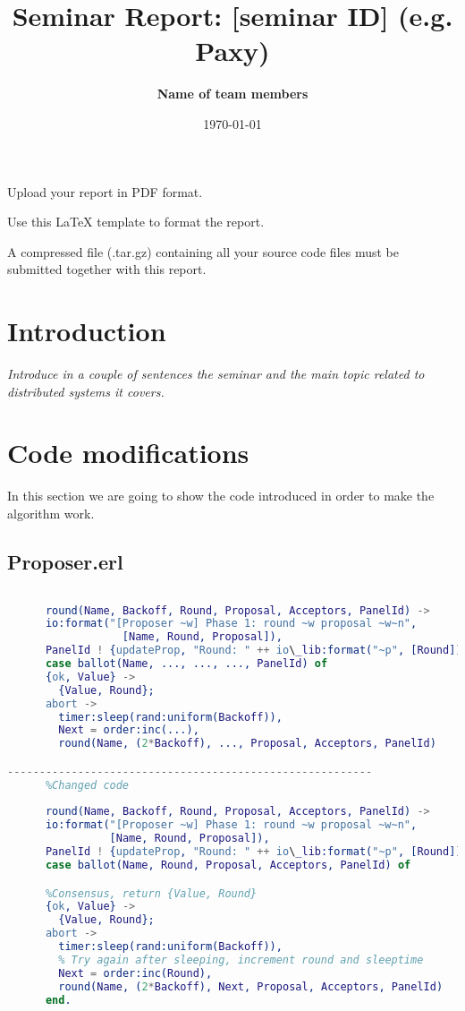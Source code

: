 \documentclass[a4paper, 10pt]{article}
\title{Seminar Report: [seminar ID] (e.g. Paxy)}
\author{\textbf{Name of team members}}
\date{\normalsize\today{}}
\begin{document}
\maketitle

\begin{center}
  Upload your report in PDF format.
  
  Use this LaTeX template to format the report.
  
	A compressed file (.tar.gz) containing all your source code files must be submitted together with this report.
\end{center}

\section{Introduction}

\textit{Introduce in a couple of sentences the seminar and the main topic related to distributed systems it covers.}

\section{Code modifications}

  In this section we are going to show the code introduced in order to make the algorithm work.

  \subsection{Proposer.erl}

    \begin{lstlisting}[language=erlang]
      %Provided code
      
      round(Name, Backoff, Round, Proposal, Acceptors, PanelId) ->
      io:format("[Proposer ~w] Phase 1: round ~w proposal ~w~n", 
                  [Name, Round, Proposal]),
      PanelId ! {updateProp, "Round: " ++ io\_lib:format("~p", [Round]), Proposal},
      case ballot(Name, ..., ..., ..., PanelId) of  
      {ok, Value} ->
        {Value, Round};
      abort ->
        timer:sleep(rand:uniform(Backoff)),
        Next = order:inc(...),
        round(Name, (2*Backoff), ..., Proposal, Acceptors, PanelId)

---------------------------------------------------------
      %Changed code 
      
      round(Name, Backoff, Round, Proposal, Acceptors, PanelId) ->
      io:format("[Proposer ~w] Phase 1: round ~w proposal ~w~n", 
                [Name, Round, Proposal]),
      PanelId ! {updateProp, "Round: " ++ io\_lib:format("~p", [Round]), Proposal},
      case ballot(Name, Round, Proposal, Acceptors, PanelId) of

      %Consensus, return {Value, Round}
      {ok, Value} ->
        {Value, Round};
      abort ->
        timer:sleep(rand:uniform(Backoff)),
        % Try again after sleeping, increment round and sleeptime
        Next = order:inc(Round),
        round(Name, (2*Backoff), Next, Proposal, Acceptors, PanelId)
      end.
    \end{lstlisting}
\end{document}

